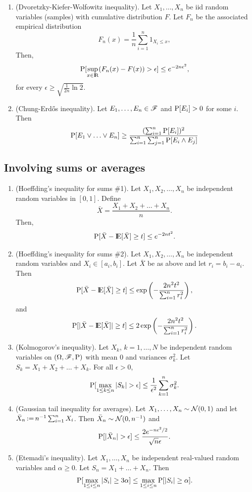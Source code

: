 \documentclass[a4paper,10pt]{scrbook}
\begin{document}
\begin{enumerate}
\item (Dvoretzky-Kiefer-Wolfowitz inequality). Let $X_1,\ldots, X_n$ be iid random variables (samples)
      with cumulative distribution $F$. Let $F_n$ be the associated empirical distribution
      \[
       F_n(x) = \frac{1}{n}\sum_{i=1}^n 1_{X_i\leq x},
      \]
      Then,
      \[
       \prob[\sup_{x\in\Re}(F_n(x) - F(x)) > \epsilon] \leq e^{-2n\epsilon^2},
      \]
      for every $\epsilon \geq \sqrt{\tfrac{1}{2n}\ln 2}$.
\item (Chung-Erd\H{o}s inequality). Let $E_1,\ldots, E_n\in\mathscr{F}$ and $\mathrm{P}[E_i]>0$ for some $i$. Then 
      \[
       \mathrm{P}[E_1 \vee \ldots \vee E_n] \geq \frac{(\sum_{i=1}^{n}\mathrm{P}[E_i])^2}{\sum_{i=1}^{n}\sum_{j=1}^{n}\mathrm{P}[E_i\wedge E_j]}
      \]

\end{enumerate}

\subsection{Involving sums or averages}
\begin{enumerate}
 \item (Hoeffding's inequality for sums \#1). Let $X_1,X_2,\ldots, X_n$ be independent random variables in $[0,1]$. Define 
  \[
  \bar{X} = \frac{X_1 + X_2 + \ldots + X_n}{n}.
  \]
  Then,
  \[
  \prob[\bar{X} - \E[\bar{X}] \geq t] \leq e^{-2nt^2}.
  \]
\item (Hoeffding's inequality for sums \#2). Let $X_1,X_2,\ldots, X_n$ be independent random variables and $X_i\in [a_i, b_i]$.
  Let $\bar{X}$ be as above and let $r_i = b_i - a_i$. Then
  \[
  \prob[\bar{X} - \E[\bar{X}] \geq t] \leq \exp\left({-\frac{2n^2t^2}{\sum_{i=1}^{n} r_i^2}}\right),
  \]
  and
  \[
  \prob[ |\bar{X} - \E[\bar{X}]| \geq t] \leq 2 \exp\left({-\frac{2n^2t^2}{\sum_{i=1}^{n} r_i^2}}\right).
  \]
\item (Kolmogorov's inequality). Let $X_k$, $k=1,\ldots, N$ be independent random variables on $(\Omega,\mathscr{F},\mathrm{P})$
      with mean $0$ and variances $\sigma_k^2$. Let $S_k = X_1 + X_2 + \ldots + X_k$. For all $\epsilon>0$,
      \[
       \prob[\max_{1\leq k\leq n}|S_k|>\epsilon] \leq \frac{1}{\epsilon^2}\sum_{k=1}^{n}\sigma_k^2.
      \]
\item (Gaussian tail inequality for averages). Let $X_1,\ldots,X_n\sim \mathcal N(0,1)$ and 
      let $\bar{X}_n {}\mathop{\mathrel{:}=}{} n^{-1}\sum_{i=1}^{n}X_i$. Then $\bar{X}_n\sim \mathcal N(0,n^{-1})$ and
      \[
       \prob[|\bar{X}_n|>\epsilon] \leq \frac{2e^{-n\epsilon^2/2}}{\sqrt{n}\epsilon}.
      \]
\item (Etemadi's inequality). Let $X_1,\ldots, X_n$ be independent real-valued random variables and $\alpha\geq 0$.
      Let $S_n = X_1 + \ldots + X_n$. Then
      \[
       \mathrm{P}[\max_{1\leq i \leq n}|S_i|\geq 3\alpha]\leq \max_{1\leq i \leq n}\mathrm{P}[|S_i|\geq \alpha].
      \]

\end{enumerate}
\end{document}
